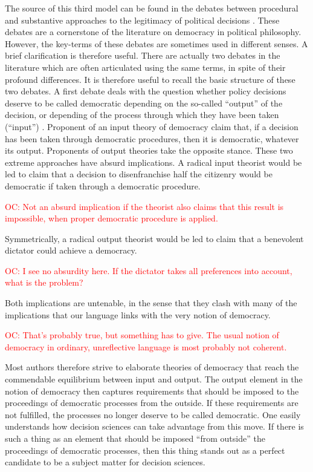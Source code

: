 \documentclass[preprint,11pt]{elsarticle}
\newcommand{\commentOC}[1]{\textcolor{red}{OC: #1}}
\begin{document}
The source of this third model can be found in the debates between procedural and substantive approaches to the legitimacy of political decisions \cite{meinard_what_2017}. These debates are a cornerstone of the literature on democracy in political philosophy. However, the key-terms of these debates are sometimes used in different senses. A brief clarification is therefore useful. There are actually two debates in the literature which are often articulated using the same terms, in spite of their profound differences. It is therefore useful to recall the basic structure of these two debates.
A first debate deals with the question whether policy decisions deserve to be called democratic depending on the so-called “output” of the decision, or depending of the process through which they have been taken (“input”) \cite{vatn_environmental_2016, backstrand_environmental_2010}. Proponent of an input theory of democracy claim that, if a decision has been taken through democratic procedures, then it is democratic, whatever its output. Proponents of output theories take the opposite stance. These two extreme approaches have absurd implications. A radical input theorist would be led to claim that a decision to disenfranchise half the citizenry would be democratic if taken through a democratic procedure. 

\commentOC{Not an absurd implication if the
theorist also claims that this result is impossible, when
proper democratic procedure is applied.}

Symmetrically, a radical output theorist would be led to claim that a benevolent dictator could achieve a democracy. 

\commentOC{ I see no absurdity here. If the
dictator takes all preferences into account, what is the
problem?
}

Both implications are untenable, in the sense that they clash with many of the implications that our language links with the very notion of democracy. 

\commentOC{That’s probably true, but
something has to give. The usual notion of democracy in
ordinary, unreflective language is most probably not
coherent.}

Most authors therefore strive to elaborate theories of democracy that reach the commendable equilibrium between input and output. The output element in the notion of democracy then captures requirements that should be imposed to the proceedings of democratic processes from the outside. If these requirements are not fulfilled, the processes no longer deserve to be called democratic. One easily understands how decision sciences can take advantage from this move. If there is such a thing as an element that should be imposed “from outside” the proceedings of democratic processes, then this thing stands out as a perfect candidate to be a subject matter for decision sciences.
\end{document}
